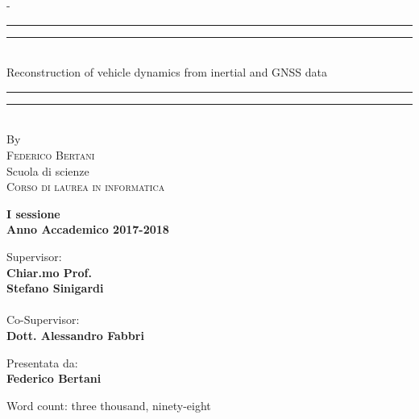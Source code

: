 \begin{titlingpage}
\begin{SingleSpace}
\calccentering{\unitlength} 
\begin{adjustwidth*}{\unitlength}{-\unitlength}
\vspace*{13mm}
\begin{center}
\rule[0.5ex]{\linewidth}{2pt}\vspace*{-\baselineskip}\vspace*{3.2pt}
\rule[0.5ex]{\linewidth}{1pt}\\[\baselineskip]
{\HUGE Reconstruction of vehicle dynamics from inertial and GNSS data }\\[4mm]
\rule[0.5ex]{\linewidth}{1pt}\vspace*{-\baselineskip}\vspace{3.2pt}
\rule[0.5ex]{\linewidth}{2pt}\\
\vspace{6.5mm}
{\large By}\\
\vspace{6.5mm}
{\large\textsc{Federico Bertani}}\\
\vspace{11mm}
{\large Scuola di scienze\\
\textsc{Corso di laurea in informatica}}\\
\vspace{10mm}
\begin{center}
{\large{\bf I sessione\\
Anno Accademico 2017-2018 }}
\end{center}
\vfill
\noindent
\begin{minipage}[t]{0.47\textwidth}
{\large Supervisor:\\
\textbf{Chiar.mo Prof.\\
Stefano Sinigardi}\\
\\
Co-Supervisor:\\
\textbf{Dott. Alessandro Fabbri}}
\end{minipage}
\hfill
\begin{minipage}[t]{0.47\textwidth}\raggedleft
{\large Presentata da:\\
\textbf{Federico Bertani}}
\end{minipage}
\vspace{20mm}
\end{center}
\end{adjustwidth*}
\end{SingleSpace}
\vspace{11mm}
\begin{flushright}
{\small Word count: three thousand, ninety-eight}
\end{flushright}
\end{titlingpage}
